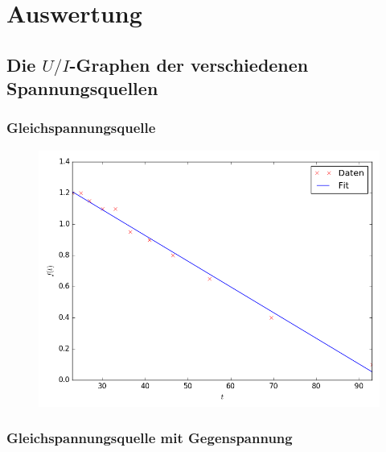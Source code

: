 \section{Auswertung}
\label{sec:Auswertung}



\subsection{Die $U/I$-Graphen der verschiedenen Spannungsquellen}

\subsubsection{Gleichspannungsquelle}
\begin{figure}[H]
	\centering
	\caption{}
	\includegraphics[width=\linewidth-70pt,height=\textheight-70pt,keepaspectratio]{Gleichstrom.png}
	\label{fig:Gleichstrom}
\end{figure}


\newpage
\subsubsection{Gleichspannungsquelle mit Gegenspannung}

